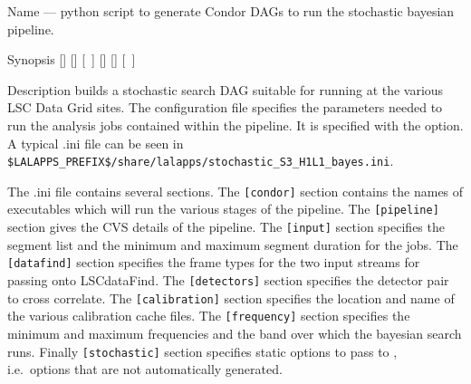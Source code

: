 \begin{entry}
\item[Name]
 --- python script to generate Condor DAGs
to run the stochastic bayesian pipeline.

\item[Synopsis]
 \newline \hspace*{0.5in}
[] \newline \hspace*{0.5in}
[] \newline \hspace*{0.5in}
[~] \newline \hspace*{0.5in}
[] \newline \hspace*{0.5in}
[] \newline \hspace*{0.5in}
[~] \newline \hspace*{0.5in}
~ \newline \hspace*{0.5in}
~

\item[Description]
 builds a stochastic search DAG suitable
for running at the various LSC Data Grid sites. The configuration file
specifies the parameters needed to run the analysis jobs contained
within the pipeline. It is specified with the 
option. A typical .ini file can be seen in\\
\texttt{\$LALAPPS\_PREFIX\$/share/lalapps/stochastic\_S3\_H1L1\_bayes.ini}.

The .ini file contains several sections. The \verb$[condor]$ section
contains the names of executables which will run the various stages of
the pipeline. The \verb$[pipeline]$ section gives the CVS details of the
pipeline. The \verb$[input]$ section specifies the segment list and the
minimum and maximum segment duration for the jobs. The \verb$[datafind]$
section specifies the frame types for the two input streams for passing
onto LSCdataFind. The \verb$[detectors]$ section specifies the detector
pair to cross correlate. The \verb$[calibration]$ section specifies the
location and name of the various calibration cache files. The
\verb$[frequency]$ section specifies the minimum and maximum frequencies
and the band over which the bayesian search runs. Finally
\verb$[stochastic]$ section specifies static options to pass to
, i.e.~options that are not automatically
generated.


\end{entry}
